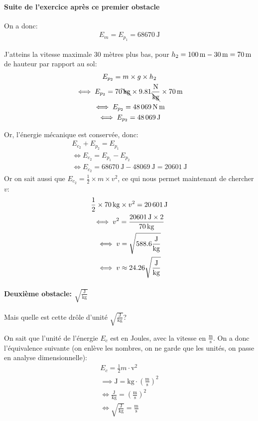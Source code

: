 \paragraph{Suite de l'exercice après ce premier obstacle}
On a donc:
\begin{gather*}
    E_{m} = E_{p_1} = \SI{68670}{\joule}
\end{gather*}

J'atteins la vitesse maximale 30 mètres plus bas, pour $h_{2} = 100\,\mathrm{m} - 30\,\mathrm{m} = 70\,\mathrm{m}$ de hauteur par rapport au sol:
\begin{gather*}
    E_{p_2} = m \times g \times h_2 \\
    \iff E_{p_2} = 70\bcancel{\,\mathrm{kg}} \times \num{9,81}{\frac{\mathrm{N}}{\bcancel{\mathrm{kg}}}} \times \SI{70}{\meter} \\
    \iff E_{p_2} = \SI{48069}{\newton\meter} \\
    \iff E_{p_2} = \SI{48069}{\joule}
\end{gather*}

Or, l'énergie mécanique est conservée, donc:
\begin{gather*}
    E_{c_2} + E_{p_2} = E_{p_1} \\
    \iff E_{c_2} = E_{p_1} - E_{p_2} \\
    \iff E_{c_2} = \SI{68670}{\joule} - \SI{48069}{\joule} = \SI{20601}{\joule}
\end{gather*}
Or on sait aussi que $E_{c_2} = \frac{1}{2} \times m \times v^2$, ce qui nous permet maintenant de chercher $v$:
\begin{gather*}
    \frac{1}{2} \times 70\,\mathrm{kg} \times v^2 = \SI{20601}{\joule} \\
    \iff v^2 = \frac{20601\,\mathrm{J} \times 2}{70\,\mathrm{kg}} \\
    \iff v = \sqrt{\num{588,6} \frac{\mathrm{J}}{\mathrm{kg}}} \\
    \iff v \approx \num{24,26}\sqrt{\frac{\mathrm{J}}{\mathrm{kg}}}
\end{gather*}

\paragraph{Deuxième obstacle: $\sqrt{\frac{\mathrm{J}}{\mathrm{kg}}}$}
Mais quelle est cette drôle d'unité $\sqrt{\frac{\mathrm{J}}{\mathrm{kg}}}$?

On sait que l'unité de l'énergie $E_c$ est en Joules, avec la vitesse en $\mathrm{\frac{m}{s}}$. On a donc l'équivalence suivante (on enlève les nombres, on ne garde que les unités, on passe en analyse dimensionnelle): 
\begin{gather*}
    E_c = \frac{1}{2}m\cdot \mathrm{v^2} \\
    \implies \mathrm{J} = \mathrm{kg \cdot \left(\frac{\mathrm{m}} {\mathrm{s}} \right)^2} \\
    \iff \frac{\mathrm{J}}{\mathrm{kg}} = \left(\frac{\mathrm{m}} {\mathrm{s}} \right)^2 \\
    \iff \sqrt{\frac{\mathrm{J}}{\mathrm{kg}}} = \frac{\mathrm{m}} {\mathrm{s}}
\end{gather*}


